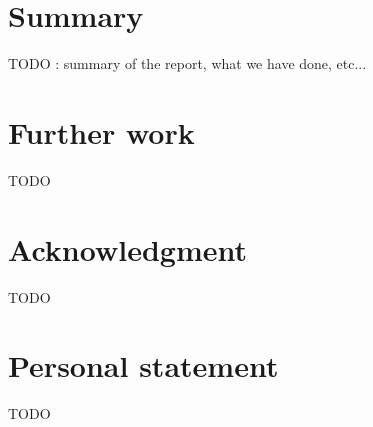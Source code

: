 \label{chap:conclusion}

\section{Summary}
\label{sec:summary}

TODO : summary of the report, what we have done, etc...

\section{Further work}
\label{sec:further_work}

TODO

\section{Acknowledgment}
\label{sec:acknowledgment}

TODO

\section{Personal statement}
\label{sec:personal_statement}

TODO

